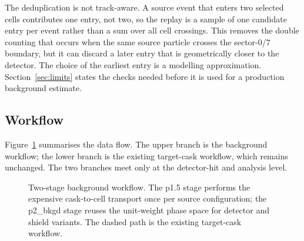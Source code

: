 \documentclass[11pt,a4paper]{article}
\begin{document}
The deduplication is not track-aware. A source event that enters two selected
cells contributes one entry, not two, so the replay is a sample of one candidate
entry per event rather than a sum over all cell crossings. This removes the
double counting that occurs when the same source particle crosses the
sector-0/7 boundary, but it can discard a later entry that is geometrically
closer to the detector. The choice of the earliest entry is a modelling
approximation. Section~\ref{sec:limits} states the checks needed before it is
used for a production background estimate.

\subsection{Workflow}

Figure~\ref{fig:workflow} summarises the data flow. The upper branch is the
background workflow; the lower branch is the existing target-cask workflow,
which remains unchanged. The two branches meet only at the detector-hit and
analysis level.

\begin{figure}[t]
  \centering
  \caption{Two-stage background workflow. The p1.5 stage performs the expensive
  cask-to-cell transport once per source configuration; the p2\_bkgd stage
  reuses the unit-weight phase space for detector and shield variants. The
  dashed path is the existing target-cask workflow.}
  \label{fig:workflow}
\end{figure}
\end{document}

